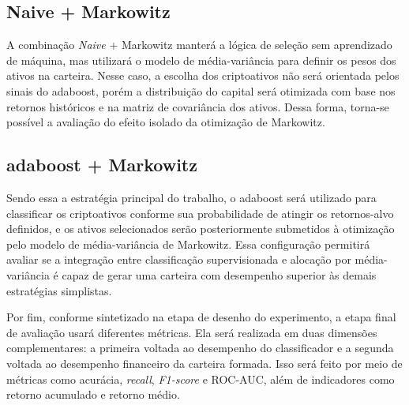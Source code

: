 \subsection{Naive + Markowitz}
\label{subsec_naive_markowitz}

A combinação \textit{Naive} + Markowitz manterá a lógica de seleção sem aprendizado de máquina, mas utilizará o modelo de média-variância para definir os pesos dos ativos na carteira. Nesse caso, a escolha dos criptoativos não será orientada pelos sinais do \acs{adaboost}, porém a distribuição do capital será otimizada com base nos retornos históricos e na matriz de covariância dos ativos. Dessa forma, torna-se possível a avaliação do efeito isolado da otimização de Markowitz.

\subsection{\acs{adaboost} + Markowitz}
\label{subsec_adaboost_markowitz}

Sendo essa a estratégia principal do trabalho, o \acs{adaboost} será utilizado para classificar os criptoativos conforme sua probabilidade de atingir os retornos-alvo definidos, e os ativos selecionados serão posteriormente submetidos à otimização pelo modelo de média-variância de Markowitz. Essa configuração permitirá avaliar se a integração entre classificação supervisionada e alocação por média-variância é capaz de gerar uma carteira com desempenho superior às demais estratégias simplistas.

Por fim, conforme sintetizado na etapa de desenho do experimento, a etapa final de avaliação usará diferentes métricas. Ela será realizada em duas dimensões complementares: a primeira voltada ao desempenho do classificador e a segunda voltada ao desempenho financeiro da carteira formada. Isso será feito por meio de métricas como acurácia, \textit{recall}, \textit{F1-score} e ROC-AUC, além de indicadores como retorno acumulado e retorno médio.
